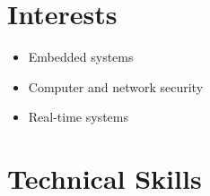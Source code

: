 \documentclass[10pt]{article}
\begin{document}
\section*{Interests}
\begin{itemize}
	\item Embedded systems
	\item Computer and network security
	\item Real-time systems
\end{itemize}

%
\section*{Technical Skills}
\end{document}

